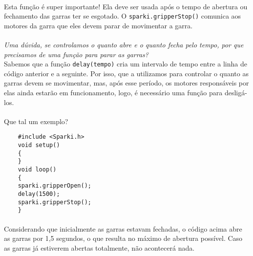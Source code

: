 \paragraph{}
Esta função é super importante! Ela deve ser usada após o tempo de abertura ou fechamento das garras ter se esgotado. O \texttt{sparki.gripperStop()} comunica aos motores da garra que eles devem parar de movimentar a garra.
\\~\\
\textit{Uma dúvida, se controlamos o quanto abre e o quanto fecha pelo tempo, por que precisamos de uma função para parar as garras?} \\
Sabemos que a função \texttt{delay(tempo)} cria um intervalo de tempo entre a linha de código anterior e a seguinte. Por isso, que a utilizamos para controlar o quanto as garras devem se movimentar, mas, após esse período, os motores responsáveis por elas ainda estarão em funcionamento, logo, é necessário uma função para desligá-los. 
\\~\\
Que tal um exemplo?

\begin{verbatim}
    #include <Sparki.h>
    void setup()
    {
    }
    void loop()
    {
    sparki.gripperOpen();  
    delay(1500);           
    sparki.gripperStop();
    }
\end{verbatim}

\paragraph{}
Considerando que inicialmente as garras estavam fechadas, o código acima abre as garras por 1,5 segundos, o que resulta no máximo de abertura possível. Caso as garras já estiverem abertas totalmente, não acontecerá nada.
\\~\\

